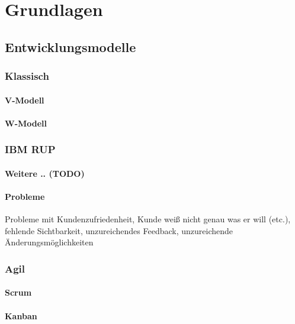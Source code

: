 \chapter{Grundlagen}

\section{Entwicklungsmodelle}

\subsection{Klassisch}

\subsubsection{V-Modell}

\subsubsection{W-Modell}

\subsection{IBM RUP}

\subsubsection{Weitere .. (TODO)}

\subsubsection{Probleme}

Probleme mit Kundenzufriedenheit, Kunde weiß nicht genau was er will (etc.),
fehlende Sichtbarkeit, unzureichendes Feedback, unzureichende Änderungsmöglichkeiten

\subsection{Agil}

\subsubsection{Scrum}

\subsubsection{Kanban}

